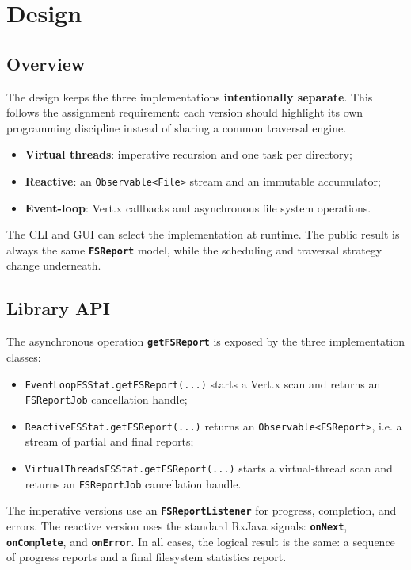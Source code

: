 \clearpage
\section{Design}

\subsection{Overview}

The design keeps the three implementations \textbf{intentionally separate}.
This follows the assignment requirement: each version should highlight its own programming discipline instead of sharing a common traversal engine.

\begin{itemize}
  \item \textbf{Virtual threads}: imperative recursion and one task per directory;
  \item \textbf{Reactive}: an \texttt{Observable<File>} stream and an immutable accumulator;
  \item \textbf{Event-loop}: Vert.x callbacks and asynchronous file system operations.
\end{itemize}

The CLI and GUI can select the implementation at runtime.
The public result is always the same \textbf{\texttt{FSReport}} model, while the scheduling and traversal strategy change underneath.

\subsection{Library API}

The asynchronous operation \textbf{\texttt{getFSReport}} is exposed by the three implementation classes:

\begin{itemize}
  \item \texttt{EventLoopFSStat.getFSReport(...)} starts a Vert.x scan and returns an \texttt{FSReportJob} cancellation handle;
  \item \texttt{ReactiveFSStat.getFSReport(...)} returns an \texttt{Observable<FSReport>}, i.e. a stream of partial and final reports;
  \item \texttt{VirtualThreadsFSStat.getFSReport(...)} starts a virtual-thread scan and returns an \texttt{FSReportJob} cancellation handle.
\end{itemize}

The imperative versions use an \textbf{\texttt{FSReportListener}} for progress, completion, and errors.
The reactive version uses the standard RxJava signals: \textbf{\texttt{onNext}}, \textbf{\texttt{onComplete}}, and \textbf{\texttt{onError}}.
In all cases, the logical result is the same: a sequence of progress reports and a final filesystem statistics report.

